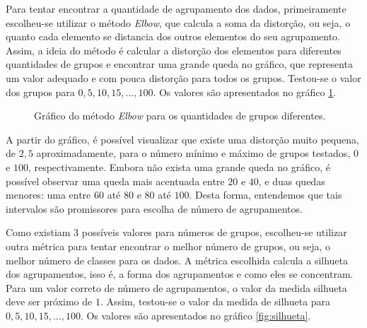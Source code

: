 \documentclass[conference]{IEEEtran}
\begin{document}
Para tentar encontrar a quantidade de agrupamento dos dados, primeiramente escolheu-se utilizar o método \emph{Elbow}, que calcula a soma da distorção, ou seja, o quanto cada elemento se distancia dos outros elementos do seu agrupamento. Assim, a ideia do método é calcular a distorção dos elementos para diferentes quantidades de grupos e encontrar uma grande queda no gráfico, que representa um valor adequado e com pouca distorção para todos os grupos. Testou-se o valor dos grupos para $0, 5, 10, 15, ..., 100$. Os valores são apresentados no gráfico \ref{fig:elbow}.

\begin{figure}[!h]
	\centering
	{
	}
	\caption{\small Gráfico do método \emph{Elbow} para os quantidades de grupos diferentes.}
	\label{fig:elbow}
\end{figure}

A partir do gráfico, é possível visualizar que existe uma distorção muito pequena, de $2,5$ aproximadamente, para o número mínimo e máximo de grupos testados, $0$ e $100$, respectivamente. Embora não exista uma grande queda no gráfico, é possível observar uma queda mais acentuada entre $20$ e $40$, e duas quedas menores: uma entre $60$ até $80$ e $80$ até $100$. Desta forma, entendemos que tais intervalos são promissores para escolha de número de agrupamentos.

Como existiam 3 possíveis valores para números de grupos, escolheu-se utilizar outra métrica para tentar encontrar o melhor número de grupos, ou seja, o melhor número de classes para os dados. A métrica escolhida calcula a silhueta dos agrupamentos, isso é, a forma dos agrupamentos e como eles se concentram. Para um valor correto de número de agrupamentos, o valor da medida silhueta deve ser próximo de $1$. Assim, testou-se o valor da medida de silhueta para $0, 5, 10, 15, ..., 100$. Os valores são apresentados no gráfico \ref{fig:silhueta}.
\end{document}
